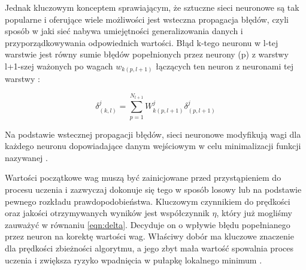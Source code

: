 Jednak kluczowym konceptem sprawiającym, że sztuczne sieci neuronowe są tak popularne i oferujące wiele możliwości jest wsteczna propagacja błędów, czyli sposób w jaki sieć nabywa umiejętności generalizowania danych i przyporządkowywania odpowiednich wartości. Błąd k-tego neuronu w l-tej warstwie jest równy sumie błędów popełnionych przez neurony (p) z warstwy l+1-szej ważonych po wagach $w_{k(p,l+1)}$ łączących ten neuron z neuronami tej warstwy \cite{Prezentacja:SNN}: 

\[
\delta_{(k,l)}^{j} = \sum_{p=1}^{N_{l+1}} W^{j}_{k(p, l+1)} \delta_{(p,l+1)}^{j}
\]

Na podstawie wstecznej propagacji błędów, sieci neuronowe modyfikują wagi dla każdego neuronu dopowiadające danym wejściowym w celu minimalizacji funkcji nazywanej .

Wartości początkowe wag muszą być zainicjowane przed przystąpieniem do procesu uczenia i zazwyczaj dokonuje się tego w sposób losowy lub na podstawie pewnego rozkładu prawdopodobieństwa. Kluczowym czynnikiem do prędkości oraz jakości otrzymywanych wyników jest współczynnik $\eta$, który już mogliśmy zauważyć w równaniu \ref{eqn:delta}. Decyduje on o wpływie błędu popełnianego przez neuron na korektę wartości wag. Właściwy dobór ma kluczowe znaczenie dla prędkości zbieżności algorytmu, a jego zbyt mała wartość spowalnia proces uczenia i zwiększa ryzyko
wpadnięcia w pułapkę lokalnego minimum \cite{Prezentacja:SNN}. 

